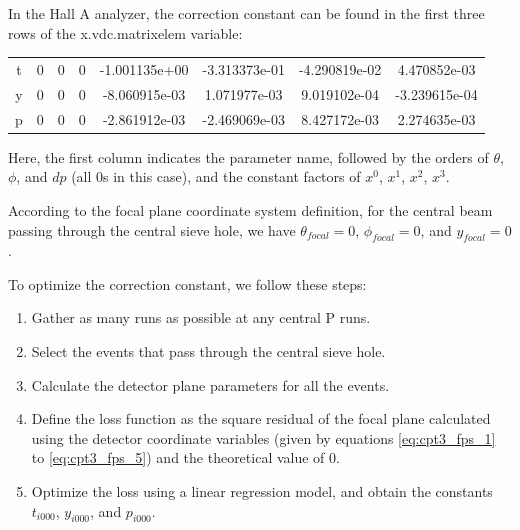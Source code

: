 In the Hall A analyzer, the correction constant can be found in the first three rows of the x.vdc.matrixelem variable:

\begin{center}
    \begin{tabular}{c c c c c c c c}
        t & 0 & 0 & 0 & -1.001135e+00 & -3.313373e-01 & -4.290819e-02 & 4.470852e-03 \\
        y & 0 & 0 & 0 & -8.060915e-03 & 1.071977e-03 & 9.019102e-04 & -3.239615e-04 \\
        p & 0 & 0 & 0 & -2.861912e-03 & -2.469069e-03 & 8.427172e-03 & 2.274635e-03
    \end{tabular}
    
\end{center}

Here, the first column indicates the parameter name, followed by the orders of $\theta$, $\phi$, and $dp$ (all 0s in this case), and the constant factors of $x^0$, $x^1$, $x^2$, $x^3$.

According to the focal plane coordinate system definition, for the central beam passing through the central sieve hole, we have $\theta_{focal}=0$, $\phi_{focal}=0$, and $y_{focal}=0$.

To optimize the correction constant, we follow these steps:

\begin{enumerate}
    \item Gather as many runs as possible at any central P runs.
    \item Select the events that pass through the central sieve hole.
    \item Calculate the detector plane parameters for all the events.
    \item Define the loss function as the square residual of the focal plane calculated using the detector coordinate variables (given by equations \ref{eq:cpt3_fps_1} to \ref{eq:cpt3_fps_5}) and the theoretical value of 0.
    \item Optimize the loss using a linear regression model, and obtain the constants $t_{i000}$, $y_{i000}$, and $p_{i000}$.
\end{enumerate}


